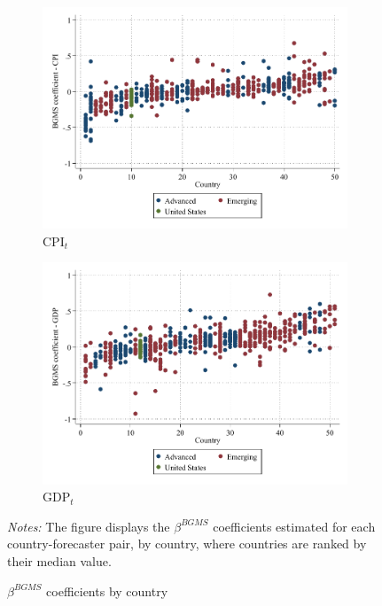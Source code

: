 \documentclass[letterpaper,12pt]{article}
\newenvironment{fignote}{\footnotesize \begin{singlespace} \noindent}{\end{singlespace} \par }
\begin{document}
\begin{figure}[H]
	
	\begin{subfigure}[b]{0.48\textwidth}
		\centering
		\includegraphics[width=1\linewidth]{../output/figures/dist_beta_cpi_cty}
		\caption{$\text{CPI}_t$ }
		\label{fig:dist_beta_cpi_cty}
	\end{subfigure}
	\hfill
	\begin{subfigure}[b]{0.48\textwidth}
		\centering
		\includegraphics[width=1\linewidth]{../output/figures/dist_beta_gdp_cty}
		\caption{$\text{GDP}_t$ }
		\label{fig:dist_beta_gdp_cty}
	\end{subfigure}
	\caption{$\beta^{BGMS}$ coefficients by country}
	\label{app:fig:dist_beta_cty}
	\begin{fignote}
		\textit{Notes:} The figure displays the $\beta^{BGMS}$ coefficients estimated for each country-forecaster pair, by country, where countries are ranked by their median value.
	\end{fignote}
\end{figure}
\end{document}
